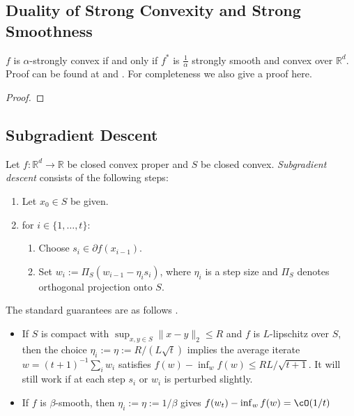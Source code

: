 \documentclass{article}
\def\R{\mathbb R}
\begin{document}
\subsection{Duality of Strong Convexity and Strong Smoothness}
$f$ is $\alpha$-strongly convex if and only if $f^*$ is $\frac{1}{\alpha}$ strongly smooth and convex over $\mathbb{R}^d$. Proof can be found at \citep[Lemma 15]{S07} and \citep[Theorem 6]{KST09}. For completeness we also give a proof here.
\begin{proof}

\end{proof}

\subsection{Subgradient Descent}
Let $f :\R^d \to \R$ be closed convex proper and $S$ be closed convex. \emph{Subgradient descent} consists of the following steps:
\begin{enumerate}
    \item
    Let $x_0 \in S$ be given.
    \item
    for $i\in \{1,\ldots,t\}$:

    \begin{enumerate}
        \item
        Choose $s_i \in \partial f(x_{i-1})$.
        \item
        Set $w_i := \Pi_S(w_{i-1} - \eta_i s_i)$, where $\eta_i$ is a step size and $\Pi_S$ denotes orthogonal projection onto $S$.
    \end{enumerate}
\end{enumerate}
The standard guarantees are as follows \citep[Chapter 3]{bubeck}.

\begin{itemize}
    \item
    If $S$ is compact with $\sup_{x,y\in S} \|x-y\|_2 \leq R$ and $f$ is $L$-lipschitz over $S$, then the choice $\eta_i := \eta := R / (L\sqrt{t})$ implies the average iterate $w = (t+1)^{-1} \sum_i w_i$ satisfies $f(w) - \inf_w f(w) \leq RL/\sqrt{t+1}$. It will still work if at each step $s_i$ or $w_i$ is perturbed slightly.

    \item
    If $f$ is $\beta$-smooth, then $\eta_i := \eta := 1/\beta$ gives $f(w_t) - \inf_w f(w) = \cO(1/t)$
\end{itemize}



\end{document}
